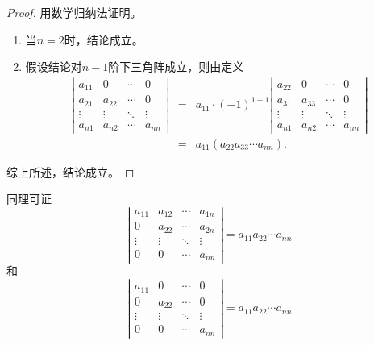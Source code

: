 \begin{frame}
\begin{proof}
  用数学归纳法证明。
  \begin{enumerate}
  \item 当$n=2$时，结论成立。 \pause 
  \item 假设结论对$n-1$阶下三角阵成立，则由定义
    $$
    \begin{array}{rcl}
      \left|
      \begin{array}{cccc}
        a_{11}  &  0 & \cdots & 0 \\
        a_{21}  &  a_{22} & \cdots & 0 \\
        \vdots & \vdots & \ddots & \vdots\\  
        a_{n1}  &  a_{n2} & \cdots & a_{nn} 
      \end{array}
                                     \right| &=&  a_{11} \cdot (-1)^{1+1} \left|
                                                 \begin{array}{cccc}
                                                   a_{22}  &  0 & \cdots & 0 \\
                                                   a_{31}  &  a_{33} & \cdots & 0 \\
                                                   \vdots & \vdots & \ddots & \vdots\\  
                                                   a_{n1}  &  a_{n2} & \cdots & a_{nn} 
                                                 \end{array}
                                                                                \right| \\[0.4in]
                &=&  a_{11} (a_{22} a_{33} \cdots a_{nn}).       
    \end{array}
    $$    
  \end{enumerate}
  综上所述，结论成立。
\end{proof}
\end{frame}

\begin{frame}
同理可证
$$
\left|
\begin{array}{cccc}
a_{11}  &  a_{12} & \cdots & a_{1n} \\
0  &  a_{22} & \cdots & a_{2n} \\
\vdots & \vdots & \ddots & \vdots\\  
0  &  0 & \cdots & a_{nn} 
\end{array}
\right| = a_{11}a_{22}\cdots a_{nn}
$$
和
$$
\left|
  \begin{array}{cccc}
    a_{11}  &  0 & \cdots & 0 \\
    0  &  a_{22} & \cdots & 0 \\
    \vdots & \vdots & \ddots & \vdots\\  
    0  &  0 & \cdots & a_{nn} 
  \end{array}
\right| = a_{11}a_{22}\cdots a_{nn}
$$
\end{frame}

